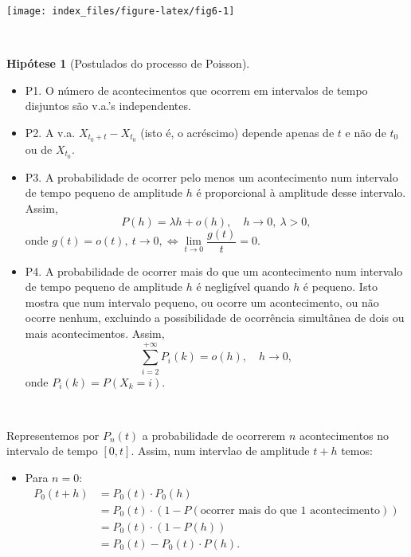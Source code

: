 \documentclass[
  11pt,
  a4paper,
]{book}
\providecommand{\tightlist}{%
  \setlength{\itemsep}{0pt}\setlength{\parskip}{0pt}}
\theoremstyle{definition}
\theoremstyle{definition}
\theoremstyle{definition}
\theoremstyle{definition}
\newtheorem{hypothesis}{Hipótese}[chapter]
\theoremstyle{remark}
\begin{document}
\begin{center}\texttt{[image: index\_files/figure-latex/fig6-1]} \end{center}

\(\,\)

\begin{hypothesis}[Postulados do processo de Poisson]
\leavevmode

\begin{itemize}
\item
  P1. O número de acontecimentos que ocorrem em intervalos de tempo disjuntos são v.a.'s independentes.
\item
  P2. A v.a. \(X_{t_0+t}-X_{t_0}\) (isto é, o acréscimo) depende apenas de \(t\) e não de \(t_0\) ou de \(X_{t_0}\).
\item
  P3. A probabilidade de ocorrer pelo menos um acontecimento num intervalo de tempo pequeno de amplitude \(h\) é proporcional à amplitude desse intervalo. Assim,
  \[P(h)=\lambda h + o(h), \quad h \to 0, ~\lambda >0,\]
  onde \(g(t)=o(t), ~t \to 0, \iff \lim\limits_{t \to 0}\dfrac{g(t)}{t}=0.\)
\item
  P4. A probabilidade de ocorrer mais do que um acontecimento num intervalo de tempo pequeno de amplitude \(h\) é negligível quando \(h\) é pequeno. Isto mostra que num intervalo pequeno, ou ocorre um acontecimento, ou não ocorre nenhum, excluindo a possibilidade de ocorrência simultânea de dois ou mais acontecimentos. Assim,
  \[\sum\limits_{i=2}^{+\infty}P_i(k)=o(h), \quad h \to 0,\]
  onde \(P_i(k)=P(X_k=i)\).
\end{itemize}

\end{hypothesis}

\(\,\)

Representemos por \(P_n(t)\) a probabilidade de ocorrerem \(n\) acontecimentos no intervalo de tempo \([0,t]\). Assim, num intervlao de amplitude \(t+h\) temos:

\begin{itemize}
\tightlist
\item
  Para \(n=0\):
  \begin{align*}
  P_0(t+h) &= P_0(t) \cdot P_{0}(h)\\
         &= P_0(t) \cdot (1- P(\text{ocorrer mais do que 1 acontecimento}))\\
         &= P_0(t) \cdot (1-P(h))\\
         &= P_0(t) - P_0(t) \cdot P(h).
  \end{align*}
\end{itemize}
\end{document}
